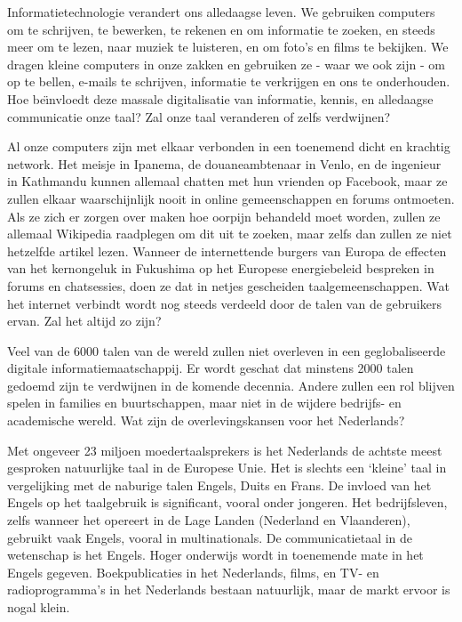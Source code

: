 \begin{multicols}{2}

Informatietechnologie verandert ons alledaagse leven. We gebruiken computers om te schrijven, te bewerken, te rekenen en om informatie te zoeken, en steeds meer om te lezen, naar muziek te luisteren, en om foto's en films te bekijken. We dragen kleine computers in onze zakken en gebruiken ze - waar we ook zijn - om op te bellen, e-mails te schrijven, informatie te verkrijgen en ons te onderhouden. Hoe \mbox{be{\"\i}nvloedt}  deze massale digitalisatie van informatie, kennis, en alledaagse communicatie onze taal? Zal onze taal veranderen of zelfs verdwijnen?

Al onze computers zijn met elkaar verbonden in een toenemend dicht en krachtig network.
Het meisje in Ipanema, de douaneambtenaar in Venlo, en de ingenieur in Kathmandu kunnen allemaal chatten met hun vrienden op Facebook, maar ze zullen elkaar waarschijnlijk nooit in online gemeenschappen en forums ontmoeten. Als ze zich er zorgen over maken hoe oorpijn behandeld moet worden, zullen ze allemaal Wikipedia raadplegen om dit uit te zoeken, maar zelfs dan zullen ze niet hetzelfde artikel lezen. Wanneer de internettende burgers van Europa de effecten van het kernongeluk in Fukushima op het Europese energiebeleid bespreken in forums en chatsessies, doen ze dat in netjes gescheiden taalgemeenschappen. Wat het internet verbindt wordt nog steeds verdeeld door de talen van de gebruikers ervan. Zal het altijd zo zijn?

Veel van de 6000 talen van de wereld zullen niet overleven in een geglobaliseerde digitale informatiemaatschappij. Er wordt geschat dat minstens 2000 talen  gedoemd zijn te verdwijnen in de komende decennia. Andere zullen een rol blijven spelen in families en buurtschappen, maar niet in de wijdere bedrijfs- en  academische wereld. Wat zijn de overlevingskansen voor het Nederlands?

Met ongeveer 23 miljoen moedertaalsprekers is het Nederlands de achtste meest gesproken natuurlijke taal in de Europese Unie. Het is slechts een `kleine' taal in vergelijking met de naburige talen Engels, Duits en Frans. De invloed van het Engels op het taalgebruik is significant, vooral onder jongeren. Het bedrijfsleven, zelfs wanneer het opereert in de Lage Landen (Nederland en Vlaanderen), gebruikt vaak Engels, vooral in multinationals. De communicatietaal in de wetenschap is het Engels. Hoger onderwijs wordt in toenemende mate in het Engels gegeven. Boekpublicaties in het Nederlands, films, en TV- en radioprogramma's in het Nederlands bestaan natuurlijk, maar de markt ervoor is nogal klein.


\end{multicols}

